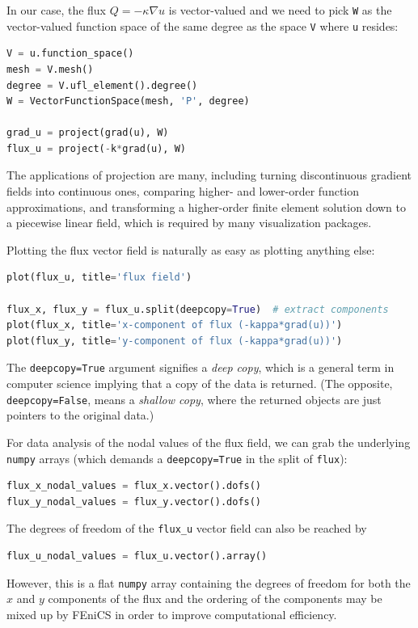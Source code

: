 \documentclass[graybox,envcountchap,sectrefs,final]{svmonodo}
\begin{document}
In our case, the flux $Q = -\kappa\nabla u$
is vector-valued and we need to pick \texttt{W} as the vector-valued function
space of the same degree as the space \texttt{V} where \texttt{u} resides:

\begin{lstlisting}[language=Python,style=graycolor]
V = u.function_space()
mesh = V.mesh()
degree = V.ufl_element().degree()
W = VectorFunctionSpace(mesh, 'P', degree)

grad_u = project(grad(u), W)
flux_u = project(-k*grad(u), W)
\end{lstlisting}

The applications of projection are many, including turning discontinuous
gradient fields into continuous ones, comparing higher- and lower-order
function approximations, and transforming a higher-order finite element
solution down to a piecewise linear field, which is required by many
visualization packages.

Plotting the flux vector field is naturally as easy as plotting
anything else:

\begin{lstlisting}[language=Python,style=graycolor]
plot(flux_u, title='flux field')

flux_x, flux_y = flux_u.split(deepcopy=True)  # extract components
plot(flux_x, title='x-component of flux (-kappa*grad(u))')
plot(flux_y, title='y-component of flux (-kappa*grad(u))')
\end{lstlisting}
The \texttt{deepcopy=True} argument signifies a \emph{deep copy}, which is
a general term in computer science implying that a copy of the data is
returned. (The opposite, \texttt{deepcopy=False},
means a \emph{shallow copy}, where
the returned objects are just pointers to the original data.)


For data analysis of the nodal values of the flux field, we can
grab the underlying \texttt{numpy} arrays (which demands a \texttt{deepcopy=True}
in the split of \texttt{flux}):

\begin{lstlisting}[language=Python,style=graycolor]
flux_x_nodal_values = flux_x.vector().dofs()
flux_y_nodal_values = flux_y.vector().dofs()
\end{lstlisting}
The degrees of freedom of the \Verb!flux_u! vector field can also be
reached by

\begin{lstlisting}[language=Python,style=graycolor]
flux_u_nodal_values = flux_u.vector().array()
\end{lstlisting}
However, this is a flat \texttt{numpy} array containing the degrees of
freedom for both the $x$ and $y$ components of the flux and the
ordering of the components may be mixed up by FEniCS in order to
improve computational efficiency.
\end{document}
